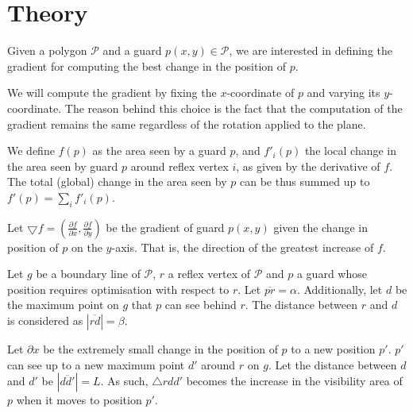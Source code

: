 \section{Theory}

Given a polygon $\mathcal P$ and a guard $p(x, y) \in \mathcal P$, we are interested in defining the gradient for computing the best change in the position of $p$.

We will compute the gradient by fixing the $x$-coordinate of $p$ and varying its $y$-coordinate. The reason behind this choice is the fact that the computation of the gradient remains the same regardless of the rotation applied to the plane.

We define $f(p)$ as the area seen by a guard $p$, and $f'_i(p)$ the local change in the area seen by guard $p$ around reflex vertex $i$, as given by the derivative of $f$. The total (global) change in the area seen by $p$ can be thus summed up to $f'(p) = \sum_i f'_i(p)$.

Let $\bigtriangledown f = (\frac{\partial f}{\partial x}, \frac{\partial f}{\partial y})$ be the gradient of guard $p(x, y)$ given the change in position of $p$ on the $y$-axis. That is, the direction of the greatest increase of $f$. 


Let $g$ be a boundary line of $\mathcal P$, $r$ a reflex vertex of $\mathcal P$ and $p$ a guard whose position requires optimisation with respect to $r$. Let $\overline{pr} = \alpha$. Additionally, let $d$ be the maximum point on $g$ that $p$ can see behind $r$. The distance between $r$ and $d$ is considered as $|\overline{rd}| = \beta$. 

Let $\partial x$ be the extremely small change in the position of $p$ to a new position $p'$. $p'$ can see up to a new maximum point $d'$ around $r$ on $g$. Let the distance between $d$ and $d'$ be $|\overline{dd'}| = L$. As such, $\triangle rdd'$ becomes the increase in the visibility area of $p$ when it moves to position $p'$. 






